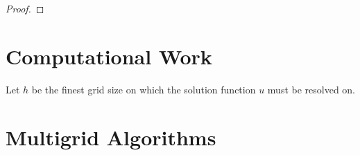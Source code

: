\documentclass[12pt]{article}
\begin{document}
\begin{proof}
    
\end{proof}


\section{Computational Work}

Let $h$ be the finest grid size on which the solution function $u$ must be resolved on. 

\section{Multigrid Algorithms} \label{sec:multigrid}

\end{document}
